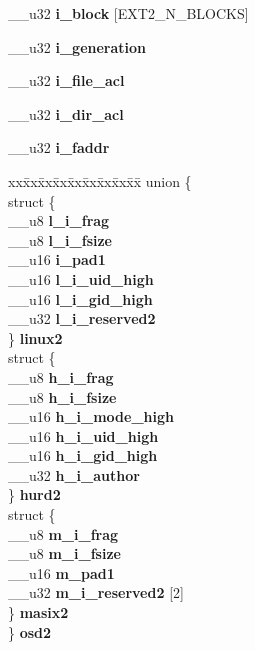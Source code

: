 \begin{DoxyCompactItemize}
\begin{tabbing}
\end{tabbing}\item 
\mbox{\label{structext2__inode_ac16cd5bb09803be1e25c5c7174036252}} 
\+\_\+\+\_\+u32 {\bfseries i\+\_\+block} \mbox{[}E\+X\+T2\+\_\+\+N\+\_\+\+B\+L\+O\+C\+KS\mbox{]}
\item 
\mbox{\label{structext2__inode_a0f92c8cbb79f456d0984f71f6d335bc8}} 
\+\_\+\+\_\+u32 {\bfseries i\+\_\+generation}
\item 
\mbox{\label{structext2__inode_ab76b72f6a2335d1035e24591773672ae}} 
\+\_\+\+\_\+u32 {\bfseries i\+\_\+file\+\_\+acl}
\item 
\mbox{\label{structext2__inode_a61242d4488f223b851400f2829f92d29}} 
\+\_\+\+\_\+u32 {\bfseries i\+\_\+dir\+\_\+acl}
\item 
\mbox{\label{structext2__inode_a7976f3b2a3c737f25a8fe8c8856a32f1}} 
\+\_\+\+\_\+u32 {\bfseries i\+\_\+faddr}
\item 
\mbox{\label{structext2__inode_a822a2bf39d9013e6814b1fcf2de7a36b}} 
\begin{tabbing}
xx\=xx\=xx\=xx\=xx\=xx\=xx\=xx\=xx\=\kill
union \{\\
\>struct \{\\
\>\>\_\_u8 {\bfseries l\_i\_frag}\\
\>\>\_\_u8 {\bfseries l\_i\_fsize}\\
\>\>\_\_u16 {\bfseries i\_pad1}\\
\>\>\_\_u16 {\bfseries l\_i\_uid\_high}\\
\>\>\_\_u16 {\bfseries l\_i\_gid\_high}\\
\>\>\_\_u32 {\bfseries l\_i\_reserved2}\\
\>\} {\bfseries linux2}\\
\>struct \{\\
\>\>\_\_u8 {\bfseries h\_i\_frag}\\
\>\>\_\_u8 {\bfseries h\_i\_fsize}\\
\>\>\_\_u16 {\bfseries h\_i\_mode\_high}\\
\>\>\_\_u16 {\bfseries h\_i\_uid\_high}\\
\>\>\_\_u16 {\bfseries h\_i\_gid\_high}\\
\>\>\_\_u32 {\bfseries h\_i\_author}\\
\>\} {\bfseries hurd2}\\
\>struct \{\\
\>\>\_\_u8 {\bfseries m\_i\_frag}\\
\>\>\_\_u8 {\bfseries m\_i\_fsize}\\
\>\>\_\_u16 {\bfseries m\_pad1}\\
\>\>\_\_u32 {\bfseries m\_i\_reserved2} \mbox{[}2\mbox{]}\\
\>\} {\bfseries masix2}\\
\} {\bfseries osd2}\\


\end{tabbing}
\end{DoxyCompactItemize}
